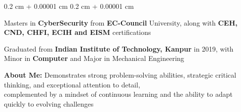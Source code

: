 \documentclass[10pt, letterpaper]{article}
\newenvironment{highlights}{
    \begin{itemize}[
        topsep=0.10 cm,
        parsep=0.10 cm,
        partopsep=0pt,
        itemsep=0pt,
        leftmargin=0.4 cm
    ]
}{
    \end{itemize}
} %
\newenvironment{onecolentry}{
    \begin{adjustwidth}{
        0.2 cm + 0.00001 cm
    }{
        0.2 cm + 0.00001 cm
    }
}{
    \end{adjustwidth}
} %
\let\hrefWithoutArrow\href
\renewcommand{\href}[2]{\hrefWithoutArrow{#1}{\ifthenelse{\equal{#2}{}}{ }{#2 }\raisebox{.15ex}{\footnotesize \faExternalLink*}}}
\begin{document}
        
        \begin{onecolentry}
            Masters in \textbf{CyberSecurity} from \textbf{EC-Council} University, along with \textbf{CEH, CND, CHFI, ECIH and EISM} certifications

            \vspace{0.15 cm}
            
            Graduated from \textbf{Indian Institute of Technology, Kanpur} in 2019, with
            Minor in \textbf{Computer} and Major in Mechanical Engineering

            \vspace{0.15 cm}
            
            


            \textbf{About Me:} Demonstrates strong problem-solving abilities, strategic critical thinking, and exceptional attention to detail, \\ complemented by a mindset of continuous learning and the ability to adapt quickly to evolving challenges

        \end{onecolentry}




\end{document}
